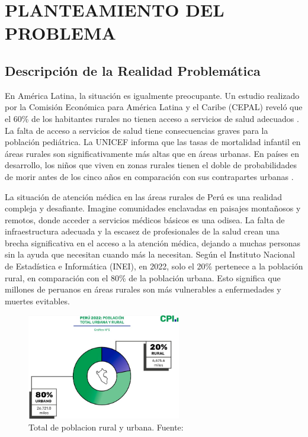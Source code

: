 \chapter{PLANTEAMIENTO DEL PROBLEMA}
\section{Descripción de la Realidad Problemática}

En América Latina, la situación es igualmente preocupante. Un estudio realizado por la Comisión Económica para América Latina y el Caribe (CEPAL) reveló que el 60\% de los habitantes rurales no tienen acceso a servicios de salud adecuados \citep*{OECD_World_Bank_2020}. La falta de acceso a servicios de salud tiene consecuencias graves para la población pediátrica. La UNICEF informa que las tasas de mortalidad infantil en áreas rurales son significativamente más altas que en áreas urbanas. En países en desarrollo, los niños que viven en zonas rurales tienen el doble de probabilidades de morir antes de los cinco años en comparación con sus contrapartes urbanas \cite{UNICEF}.

La situación de atención médica en las áreas rurales de Perú es una realidad compleja y desafiante. Imagine comunidades enclavadas en paisajes montañosos y remotos, donde acceder a servicios médicos básicos es una odisea. La falta de infraestructura adecuada y la escasez de profesionales de la salud crean una brecha significativa en el acceso a la atención médica, dejando a muchas personas sin la ayuda que necesitan cuando más la necesitan. Según el Instituto Nacional de Estadística e Informática (INEI), en 2022, solo el 20\% pertenece a la población rural, en comparación con el 80\% de la población urbana. Esto significa que millones de peruanos en áreas rurales son más vulnerables a enfermedades y muertes evitables.

\begin{figure}[h]
	\begin{center}
		\includegraphics[width=0.6\textwidth]{1/figures/INEITOTAL.jpeg}
		\caption{Total de poblacion rural y urbana. Fuente: \cite{gl_inei}}
		\label{1:fig}
	\end{center}
\end{figure}

